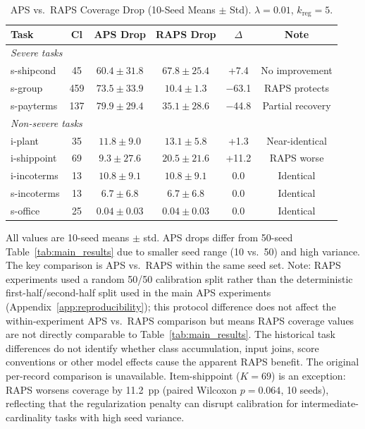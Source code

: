 \documentclass[accepted]{uai2026} %
\begin{document}
\begin{table}[htbp]
\centering
\caption{APS vs.\ RAPS Coverage Drop (10-Seed Means $\pm$ Std). $\lambda=0.01$, $k_{\text{reg}}=5$.}\label{tab:raps}
\small
\begin{tabular}{@{}lccccc@{}}
\toprule
Task & Cl & APS Drop & RAPS Drop & $\Delta$ & Note \\
\midrule
\multicolumn{6}{l}{\textit{Severe tasks}} \\
s-shipcond & 45 & $60.4\pm31.8$ & $67.8\pm25.4$ & +7.4 & No improvement \\
s-group & 459 & $73.5\pm33.9$ & $10.4\pm1.3$ & $-$63.1 & RAPS protects \\
s-payterms & 137 & $79.9\pm29.4$ & $35.1\pm28.6$ & $-$44.8 & Partial recovery \\
\midrule
\multicolumn{6}{l}{\textit{Non-severe tasks}} \\
i-plant & 35 & $11.8\pm9.0$ & $13.1\pm5.8$ & +1.3 & Near-identical \\
i-shippoint & 69 & $9.3\pm27.6$ & $20.5\pm21.6$ & +11.2 & RAPS worse \\
i-incoterms & 13 & $10.8\pm9.1$ & $10.8\pm9.1$ & 0.0 & Identical \\
s-incoterms & 13 & $6.7\pm6.8$ & $6.7\pm6.8$ & 0.0 & Identical \\
s-office & 25 & $0.04\pm0.03$ & $0.04\pm0.03$ & 0.0 & Identical \\
\bottomrule
\end{tabular}


\raggedright
\footnotesize
All values are 10-seed means $\pm$ std. APS drops differ from 50-seed Table~\ref{tab:main_results} due to smaller seed range (10 vs.\ 50) and high variance. The key comparison is APS vs.\ RAPS within the same seed set. Note: RAPS experiments used a random 50/50 calibration split rather than the deterministic first-half/second-half split used in the main APS experiments (Appendix~\ref{app:reproducibility}); this protocol difference does not affect the within-experiment APS vs.\ RAPS comparison but means RAPS coverage values are not directly comparable to Table~\ref{tab:main_results}. The historical task differences do not identify whether class accumulation, input joins, score conventions or other model effects cause the apparent RAPS benefit. The original per-record comparison is unavailable. Item-shippoint ($K=69$) is an exception: RAPS worsens coverage by 11.2~pp (paired Wilcoxon $p=0.064$, 10 seeds), reflecting that the regularization penalty can disrupt calibration for intermediate-cardinality tasks with high seed variance.
\end{table}
\end{document}

